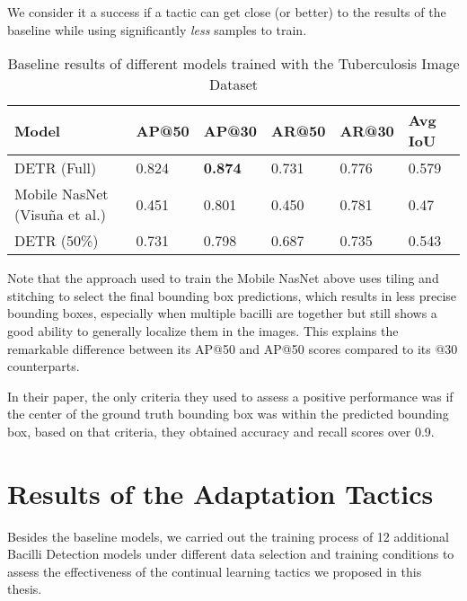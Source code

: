 \documentclass[../main.tex]{subfiles}
\begin{document}
We consider it a success if a tactic can get close (or better) to the results of the baseline while using significantly \textit{less} samples to train.


\begin{table}[h!]
\caption{Baseline results of different models trained with the Tuberculosis Image Dataset}
\label{tab:eval_metrics}
\begin{tabular}{llllll}
\toprule
Model & AP@50 & \textbf{AP@30} & AR@50 & AR@30 & Avg IoU \\
\midrule
DETR (Full) & 0.824 & \textbf{0.874} & 0.731 & 0.776 & 0.579 \\
Mobile NasNet (Visuña et al.) & 0.451 & 0.801 & 0.450 & 0.781 & 0.47 \\
DETR (50\%) & 0.731 &	0.798 & 0.687 &	0.735 &	0.543 \\
\bottomrule
\end{tabular}
\end{table}


Note that the approach used to train the Mobile NasNet above uses tiling and stitching to select the final bounding box predictions, which results in less precise bounding boxes, especially when multiple bacilli are together but still shows a good ability to generally localize them in the images. This explains the remarkable difference between its AP@50 and AP@50 scores compared to its @30 counterparts. 

In their paper, the only criteria they used to assess a positive performance was if the center of the ground truth bounding box was within the predicted bounding box, based on that criteria, they obtained accuracy and recall scores over 0.9.



\section{Results of the Adaptation Tactics} \label{results:continual_learning}

Besides the baseline models, we carried out the training process of 12 additional Bacilli Detection models under different data selection and training conditions to assess the effectiveness of the continual learning tactics we proposed in this thesis.
\end{document}
